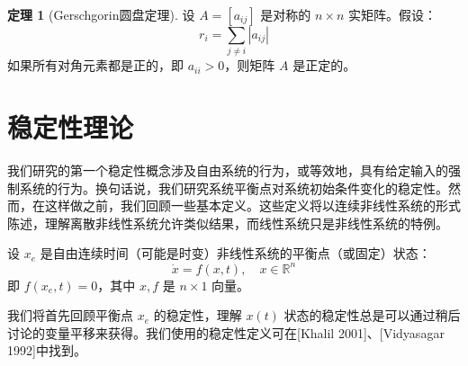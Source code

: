 \documentclass[UTF8,12pt,a4paper]{ctexart}
\theoremstyle{definition}
\newtheorem{theorem}{定理}[section]
\begin{document}
\begin{theorem}[Gerschgorin圆盘定理]
设 $A=[a_{ij}]$ 是对称的 $n \times n$ 实矩阵。假设：
\[
r_i = \sum_{j \neq i} |a_{ij}|
\]
如果所有对角元素都是正的，即 $a_{ii} > 0$，则矩阵 $A$ 是正定的。
\end{theorem}

\section{稳定性理论}

我们研究的第一个稳定性概念涉及自由系统的行为，或等效地，具有给定输入的强制系统的行为。换句话说，我们研究系统平衡点对系统初始条件变化的稳定性。然而，在这样做之前，我们回顾一些基本定义。这些定义将以连续非线性系统的形式陈述，理解离散非线性系统允许类似结果，而线性系统只是非线性系统的特例。

设 $x_e$ 是自由连续时间（可能是时变）非线性系统的平衡点（或固定）状态：
\begin{equation}\label{eq:2.6.1}
\dot{x} = f(x, t), \quad x \in \mathbb{R}^n
\end{equation}
即 $f(x_e, t) = 0$，其中 $x, f$ 是 $n \times 1$ 向量。

我们将首先回顾平衡点 $x_e$ 的稳定性，理解 $x(t)$ 状态的稳定性总是可以通过稍后讨论的变量平移来获得。我们使用的稳定性定义可在[Khalil 2001]、[Vidyasagar 1992]中找到。
\end{document}
